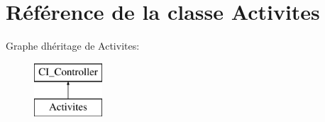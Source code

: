 \hypertarget{class_activites}{}\section{Référence de la classe Activites}
\label{class_activites}
Graphe d\textquotesingle{}héritage de Activites\+:\begin{figure}[H]
\begin{center}
\leavevmode
\includegraphics[height=2.000000cm]{class_activites}
\end{center}
\end{figure}
